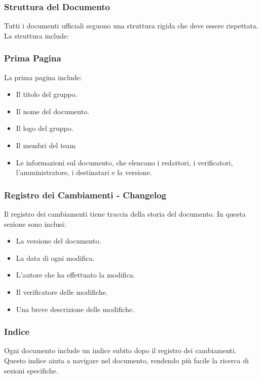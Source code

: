 \subsubsection{Struttura del Documento}

Tutti i documenti ufficiali seguono una struttura rigida che deve essere rispettata. La struttura include:

\subsubsection*{Prima Pagina}
La prima pagina include:
\begin{itemize}
    \item Il titolo del gruppo.
    \item Il nome del documento.
    \item Il logo del gruppo.
    \item Il membri del team
    \item Le informazioni sul documento, che elencano i redattori, i verificatori, l’amministratore, i destinatari e la versione.
\end{itemize}

\subsubsection*{Registro dei Cambiamenti - Changelog}
Il registro dei cambiamenti tiene traccia della storia del documento. In questa sezione sono inclusi:
\begin{itemize}
    \item La versione del documento.
    \item La data di ogni modifica.
    \item L'autore che ha effettuato la modifica.
    \item Il verificatore delle modifiche.
    \item Una breve descrizione delle modifiche.
\end{itemize}

\subsubsection*{Indice}
Ogni documento include un indice subito dopo il registro dei cambiamenti. 
Questo indice aiuta a navigare nel documento, rendendo più facile la ricerca di sezioni specifiche.

